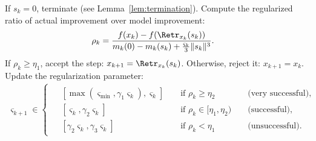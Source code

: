 \begin{algorithm}[t]
\begin{algorithmic}[1]
		\State If $s_k = 0$, terminate (see Lemma~\ref{lem:termination}).
		\State Compute the regularized ratio of actual improvement over model improvement:
		\begin{align}
			\rho_k & = \frac{f(x_k) - f(\Retr_{x_k}(s_k))}{m_k(0) - m_k(s_k) + \frac{\varsigma_k}{3} \|s_k\|^3}.
			\label{eq:rhok}
		\end{align}
		\State If $\rho_k \geq \eta_1$, accept the step: $x_{k+1} = \Retr_{x_k}(s_k)$. Otherwise, reject it: $x_{k+1} = x_k$.
		\State Update the regularization parameter:
		\begin{align}
			\varsigma_{k+1} \in
			\begin{cases}
				\begin{aligned}
					& [\max(\varsigma_{\min}, \gamma_1 \varsigma_k), \varsigma_k] & & \textrm{ if } \rho_k \geq \eta_2 & & \textrm{ (very successful),} \\
					& [\varsigma_k, \gamma_2 \varsigma_k] & & \textrm{ if } \rho_k \in [\eta_1, \eta_2) & & \textrm{ (successful),} \\
					& [\gamma_2 \varsigma_k, \gamma_3 \varsigma_k] & & \textrm{ if } \rho_k < \eta_1 & & \textrm{ (unsuccessful).}
				\end{aligned}
			\end{cases}
			\label{eq:varsigmaupdate}
		\end{align}
		\EndFor
	\end{algorithmic}
\end{algorithm}

